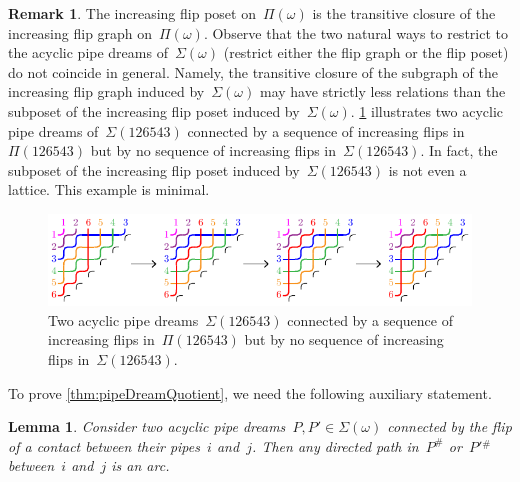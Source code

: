 \documentclass[reqno]{amsart}
\newtheorem{lemma}[theorem]{Lemma}
\theoremstyle{definition}
\newtheorem{remark}[theorem]{Remark}
\newcommand{\pipeDreams}{\Pi} %
\newcommand{\contact}{^\#} %
\newcommand{\acyclicPipeDreams}{\Sigma} %
\begin{document}
\begin{remark}
\label{rem:acyclicIncreasingFlipPosetNotLattice}
The increasing flip poset on~$\pipeDreams(\omega)$ is the transitive closure of the increasing flip graph on~$\pipeDreams(\omega)$.
Observe that the two natural ways to restrict to the acyclic pipe dreams of~$\acyclicPipeDreams(\omega)$ (restrict either the flip graph or the flip poset) do not coincide in general.
Namely, the transitive closure of the subgraph of the increasing flip graph induced by~$\acyclicPipeDreams(\omega)$ may have strictly less relations than the subposet of the increasing flip poset induced by~$\acyclicPipeDreams(\omega)$.
\cref{fig:counterExampleRestrictionIncreasingFlipPoset} illustrates two acyclic pipe dreams of~$\acyclicPipeDreams(126543)$ connected by a sequence of increasing flips in~$\pipeDreams(126543)$ but by no sequence of increasing flips in~$\acyclicPipeDreams(126543)$.
In fact, the subposet of the increasing flip poset induced by~$\acyclicPipeDreams(126543)$ is not even a lattice.
This example is minimal.

\begin{figure}[ht]
	\centerline{\includegraphics[scale=1.2]{counterExampleRestrictionIncreasingFlipPoset}}
	\caption{Two acyclic pipe dreams~$\acyclicPipeDreams(126543)$ connected by a sequence of increasing flips in~$\pipeDreams(126543)$ but by no sequence of increasing flips in~$\acyclicPipeDreams(126543)$.}
	\label{fig:counterExampleRestrictionIncreasingFlipPoset}
\end{figure}
\end{remark}

To prove \cref{thm:pipeDreamQuotient}, we need the following auxiliary statement.

\begin{lemma}
\label{lem:flippable}
Consider two acyclic pipe dreams~$P,P' \in \acyclicPipeDreams(\omega)$ connected by the flip of a contact between their pipes~$i$ and~$j$.
Then any directed path in~$P\contact$ or~$P'{}\contact$ between~$i$ and~$j$ is an arc.
\end{lemma}
\end{document}
